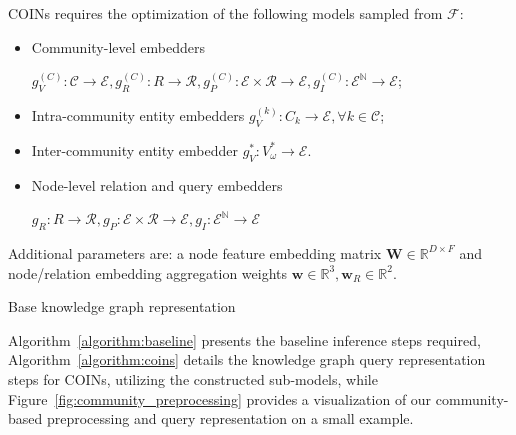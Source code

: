 COINs requires the optimization of the following models sampled from $\mathcal{F}$:
\begin{itemize}
    \item {Community-level embedders} 
    
    $g_V^{(C)}: \mathcal{C} \to \mathcal{E}, g_R^{(C)}: R \to \mathcal{R}, g_P^{(C)}: \mathcal{E} \times \mathcal{R} \to \mathcal{E}, g_I^{(C)}: \mathcal{E}^{\mathbb{N}} \to \mathcal{E}$;
    \item {Intra-community entity embedders} $g_V^{(k)}: C_k \to \mathcal{E}, \forall k \in \mathcal{C}$;
    \item {Inter-community entity embedder} $g_V^{*}: V_{\omega}^* \to \mathcal{E}$. 
    \item {Node-level relation and query embedders} 
    
    $g_R: R \to \mathcal{R}, g_P: \mathcal{E} \times \mathcal{R} \to \mathcal{E}, g_I: \mathcal{E}^{\mathbb{N}} \to \mathcal{E}$
\end{itemize}

Additional parameters are: a {node feature embedding matrix} $\mathbf{W} \in \mathbb{R}^{D \times F}$ and {node/relation embedding aggregation weights} $\mathbf{w} \in \mathbb{R}^{3}, \mathbf{w}_R \in \mathbb{R}^{2}$.

\begin{algorithm}[H]
    \caption{Base knowledge graph representation}
    \label{algorithm:baseline}
    \begin{algorithmic}[1]
    \end{algorithmic}
\end{algorithm}

 Algorithm~\ref{algorithm:baseline} presents the baseline inference steps required, Algorithm~\ref{algorithm:coins} details the knowledge graph query representation steps for COINs, utilizing the constructed sub-models, while Figure~\ref{fig:community_preprocessing} provides a visualization of our community-based preprocessing and query representation on a small example. 

